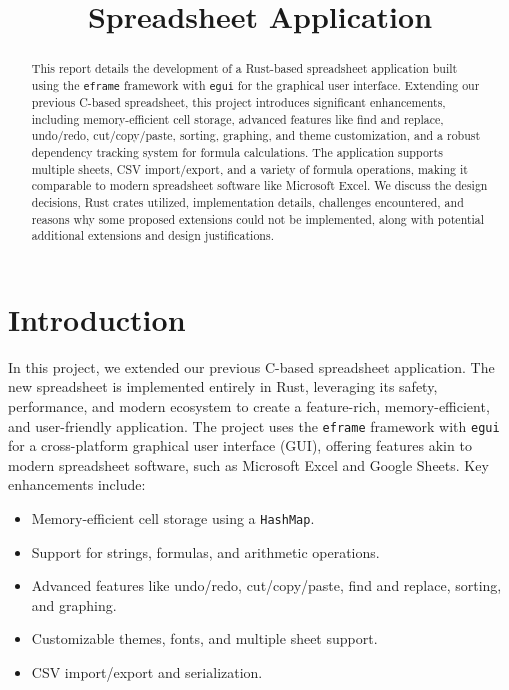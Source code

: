 \documentclass{article}
\title{Spreadsheet Application}
\author{}
\date{}
\begin{document}
\maketitle

\begin{abstract}
This report details the development of a Rust-based spreadsheet application built using the \texttt{eframe} framework with \texttt{egui} for the graphical user interface. Extending our previous C-based spreadsheet, this project introduces significant enhancements, including memory-efficient cell storage, advanced features like find and replace, undo/redo, cut/copy/paste, sorting, graphing, and theme customization, and a robust dependency tracking system for formula calculations. The application supports multiple sheets, CSV import/export, and a variety of formula operations, making it comparable to modern spreadsheet software like Microsoft Excel. We discuss the design decisions, Rust crates utilized, implementation details, challenges encountered, and reasons why some proposed extensions could not be implemented, along with potential additional extensions and design justifications. 
\end{abstract}

\section{Introduction}
In this project, we extended our previous C-based spreadsheet application. The new spreadsheet is implemented entirely in Rust, leveraging its safety, performance, and modern ecosystem to create a feature-rich, memory-efficient, and user-friendly application. The project uses the \texttt{eframe} framework with \texttt{egui} for a cross-platform graphical user interface (GUI), offering features akin to modern spreadsheet software, such as Microsoft Excel and Google Sheets. Key enhancements include:

\begin{itemize}
    \item Memory-efficient cell storage using a \texttt{HashMap}.
    \item Support for strings, formulas, and arithmetic operations.
    \item Advanced features like undo/redo, cut/copy/paste, find and replace, sorting, and graphing.
    \item Customizable themes, fonts, and multiple sheet support.
    \item CSV import/export and serialization.
\end{itemize}
\end{document}

